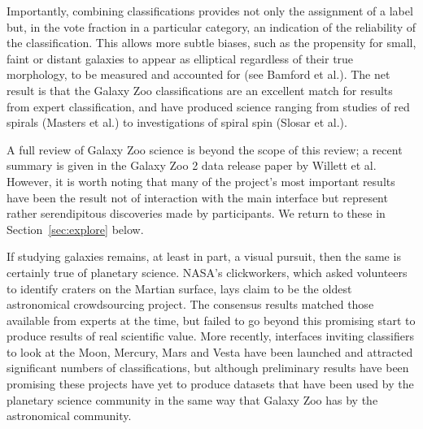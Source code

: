 \documentclass{ar2e}
\begin{document}

Importantly, combining classifications provides not only the assignment of a
label but, in the vote fraction in a particular category, an indication of the
reliability of the classification. This allows more subtle biases, such as the
propensity for small, faint or distant galaxies to appear as elliptical
regardless of their true morphology, to be measured and accounted for (see
Bamford et al.). The net result is that the Galaxy Zoo classifications are an
excellent match for results from expert classification, and have produced
science ranging from studies of red spirals (Masters et al.) to investigations
of spiral spin (Slosar et al.).


A full review of Galaxy Zoo science is beyond the scope of this review; a
recent summary is given in the Galaxy Zoo 2 data release paper by Willett et
al. However, it is worth noting that many of the project's most important
results have been the result not of interaction with the main interface but
represent rather serendipitous discoveries made by participants. We return to
these in Section~\ref{sec:explore} below.




If studying galaxies remains, at least in part, a visual pursuit, then the same
is certainly true of planetary science. NASA's clickworkers, which asked
volunteers to identify craters on the Martian surface, lays claim to be the
oldest astronomical crowdsourcing project. The consensus results matched those
available from experts at the time, but failed to go beyond this promising start
to produce results of real scientific value. More recently, interfaces inviting
classifiers to look at the Moon, Mercury, Mars and Vesta have been launched and
attracted significant numbers of classifications, but although preliminary
results have been promising these projects have yet to produce datasets that
have been used by the planetary science community in the same way that Galaxy
Zoo has by the astronomical community. 
\end{document}
